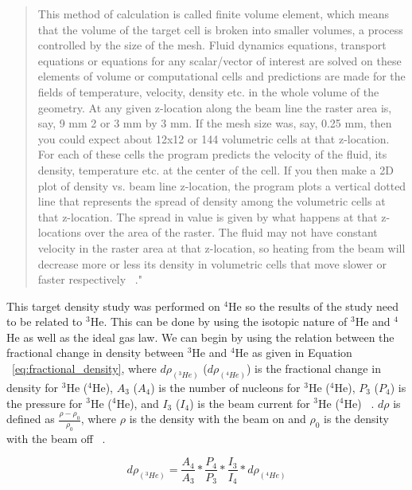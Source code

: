 \begin{quote}
This method of calculation is called finite volume element, which means that the volume of the target cell is broken into smaller volumes, a process controlled by the size of the mesh. Fluid dynamics equations, transport equations or equations for any scalar/vector of interest are solved on these elements of volume or computational cells and predictions are made for the fields of temperature, velocity, density etc. in the whole volume of the geometry. At any given z-location along the beam line the raster area is, say, 9 mm 2 or 3 mm by 3 mm. If the mesh size was, say, 0.25 mm, then you could expect about 12x12 or 144 volumetric cells at that z-location. For each of these cells the program predicts the velocity of the fluid, its density, temperature etc. at the center of the cell. If you then make a 2D plot of density vs. beam line z-location, the program plots a vertical dotted line that represents the spread of density among the volumetric cells at that z-location. The spread in value is given by what happens at that z-locations over the area of the raster. The fluid may not have constant velocity in the raster area at that z-location, so heating from the beam will decrease more or less its density in volumetric cells that move slower or faster respectively ~\cite{density}."
\end{quote}

This target density study was performed on $^4$He so the results of the study need to be related to $^3$He. This can be done by using the isotopic nature of $^3$He and $^4$He as well as the ideal gas law. We can begin by using the relation between the fractional change in density between $^3$He and $^4$He as given in Equation ~\ref{eq:fractional_density}, where $d\rho_{\left(^3He\right)}$ ($d\rho_{\left(^4He\right)}$) is the fractional change in density for $^3$He ($^4$He), $A_3$ ($A_4$) is the number of nucleons for $^3$He ($^4$He), $P_3$ ($P_4$) is the pressure for $^3$He ($^4$He), and $I_3$ ($I_4$) is the beam current for $^3$He ($^4$He) ~\cite{density}. $d\rho$ is defined as $\frac{\rho-\rho_0}{\rho_0}$, where $\rho$ is the density with the beam on and $\rho_0$ is the density with the beam off ~\cite{density}. 

\begin{equation} \label{eq:fractional_density}
	d\rho_{\left(^3He\right)} = \frac{A_4}{A_3} * \frac{P_4}{P_3} * \frac{I_3}{I_4} * d\rho_{\left(^4He\right)}
\end{equation}

